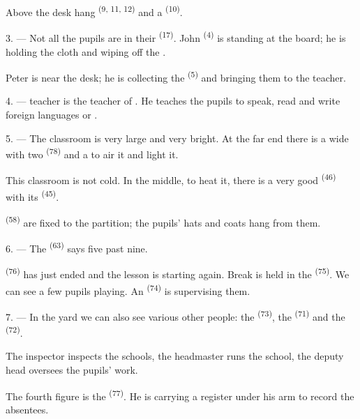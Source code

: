 Above the desk hang  \textsuperscript{(9, 11, 12)} and a
 \textsuperscript{(10)}.

3. --- Not all the pupils are in their  \textsuperscript{(17)}. John
\textsuperscript{(4)} is standing at the board; he is holding the cloth and wiping off the
.

Peter is near the desk; he is collecting the  \textsuperscript{(5)}
and bringing them to the teacher.

4. ---  teacher is the teacher of . He teaches the
pupils to speak, read and write foreign languages
 or .

5. --- The classroom is very large and very bright. At the far end there is a wide
 with two  \textsuperscript{(78)} and a
 to air it and light it.

This classroom is not cold. In the middle, to heat it, there is a very good 
\textsuperscript{(46)} with its  \textsuperscript{(45)}.

 \textsuperscript{(58)} are fixed to the partition; the pupils' hats
and coats hang from them.

\VUsaut{5.2mm}
\VUsaut{3.6mm}

6. --- The  \textsuperscript{(63)} says five past nine.

 \textsuperscript{(76)} has just ended and the lesson is starting again.
Break is held in the  \textsuperscript{(75)}. We can see a few pupils playing. An
 \textsuperscript{(74)} is supervising them.

7. --- In the yard we can also see various other people: the
 \textsuperscript{(73)}, the  \textsuperscript{(71)} and the
 \textsuperscript{(72)}.

The inspector inspects the schools, the headmaster runs the school, the deputy head oversees
the pupils' work.

The fourth figure is the  \textsuperscript{(77)}. He is carrying a register
under his arm to record the absentees.

